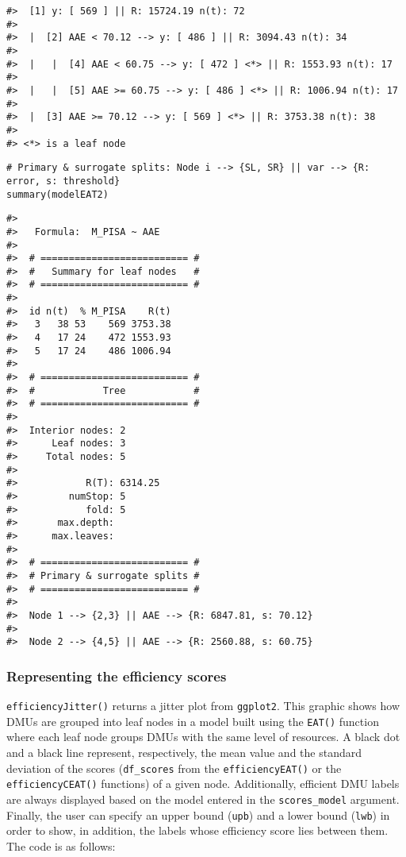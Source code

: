 \begin{verbatim}
#>  [1] y: [ 569 ] || R: 15724.19 n(t): 72 
#>  
#>  |  [2] AAE < 70.12 --> y: [ 486 ] || R: 3094.43 n(t): 34 
#>  
#>  |   |  [4] AAE < 60.75 --> y: [ 472 ] <*> || R: 1553.93 n(t): 17 
#>  
#>  |   |  [5] AAE >= 60.75 --> y: [ 486 ] <*> || R: 1006.94 n(t): 17 
#>  
#>  |  [3] AAE >= 70.12 --> y: [ 569 ] <*> || R: 3753.38 n(t): 38 
#>  
#> <*> is a leaf node
\end{verbatim}

\begin{verbatim}
# Primary & surrogate splits: Node i --> {SL, SR} || var --> {R: error, s: threshold}
summary(modelEAT2)
\end{verbatim}

\begin{verbatim}
#> 
#>   Formula:  M_PISA ~ AAE 
#> 
#>  # ========================== # 
#>  #   Summary for leaf nodes   # 
#>  # ========================== # 
#>  
#>  id n(t)  % M_PISA    R(t)
#>   3   38 53    569 3753.38
#>   4   17 24    472 1553.93
#>   5   17 24    486 1006.94
#> 
#>  # ========================== # 
#>  #            Tree            # 
#>  # ========================== # 
#>  
#>  Interior nodes: 2 
#>      Leaf nodes: 3 
#>     Total nodes: 5 
#>  
#>            R(T): 6314.25 
#>         numStop: 5 
#>            fold: 5 
#>       max.depth: 
#>      max.leaves:
#>  
#>  # ========================== # 
#>  # Primary & surrogate splits # 
#>  # ========================== # 
#>  
#>  Node 1 --> {2,3} || AAE --> {R: 6847.81, s: 70.12}
#> 
#>  Node 2 --> {4,5} || AAE --> {R: 2560.88, s: 60.75}
\end{verbatim}

\hypertarget{representing-the-efficiency-scores}{%
\subsubsection{Representing the efficiency scores}\label{representing-the-efficiency-scores}}

\texttt{efficiencyJitter()} returns a jitter plot from \texttt{ggplot2}. This graphic shows how DMUs are grouped into leaf nodes in a model built using the \texttt{EAT()} function where each leaf node groups DMUs with the same level of resources. A black dot and a black line represent, respectively, the mean value and the standard deviation of the scores (\texttt{df\_scores} from the \texttt{efficiencyEAT()} or the \texttt{efficiencyCEAT()} functions) of a given node. Additionally, efficient DMU labels are always displayed based on the model entered in the \texttt{scores\_model} argument. Finally, the user can specify an upper bound (\texttt{upb}) and a lower bound (\texttt{lwb}) in order to show, in addition, the labels whose efficiency score lies between them. The code is as follows:

